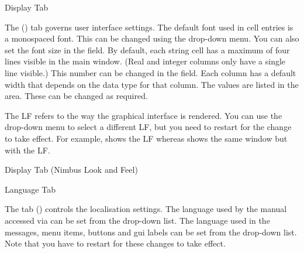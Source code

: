  {%
 }
 {Display Tab}

The  () tab governs user interface settings.
The default font used in cell entries is a monospaced font. This can be
changed using the  drop-down menu.
You can also set the font size in the 
 field. By default, each
string cell has a maximum of four lines visible in the main window.
(Real and integer columns only have a single line visible.) This
number can be changed in the 
field. Each column has a default width that depends on the data type
for that column. The values are listed in the 
 area. These can be changed
as required.

The \gls{LF} refers to the way the graphical interface
is rendered. You can use the drop-down menu to
select a different \gls{LF}, but you need to restart  
for the change to take effect. For example, 
shows the  \gls{LF} whereas
shows the same window but with the  \gls{LF}.

 {%
 }
 {Display Tab (Nimbus Look and Feel)}


 {%
 }
 {Language Tab}


The  tab () controls the localisation settings.
The language used by the manual accessed via 
can be set from the  drop-down 
list. The language used in the messages, menu items, buttons and 
\gls{gui} labels can be set from the 
 drop-down 
list. Note that you have to restart  for these changes to take 
effect.


